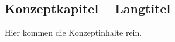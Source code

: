 \begin{showConcept}%
%
\chapter[Konzeptkapitel -- Kurztitel für Inhaltsverzeichnis und Kolumnentitel]{Konzeptkapitel -- Langtitel}%
\label{chap:Konzept}
%
Hier kommen die Konzeptinhalte rein.
%
%
\end{showConcept}%